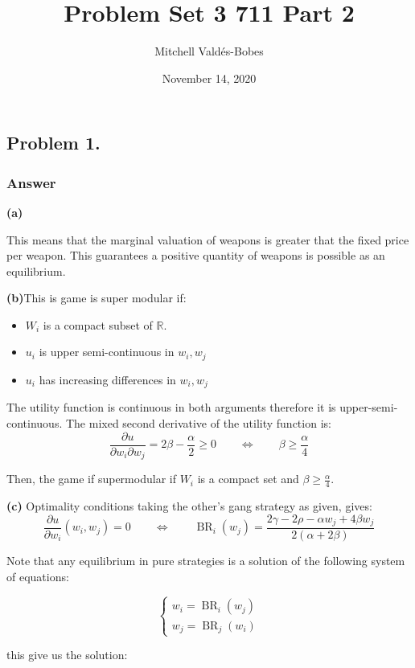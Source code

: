 \documentclass{article}
\title{Problem Set 3 711 Part 2}
\author{Mitchell Valdés-Bobes}
\date{November 14, 2020}
\theoremstyle{definition}
\newcommand{\qiffq}{\qquad \iff \qquad}
\begin{document}
\maketitle
\subsection*{Problem 1.}

\subsubsection*{Answer}
\newline
\textbf{(a)}

This means that the marginal valuation of weapons is greater that the fixed price per weapon. This guarantees a positive quantity of weapons is possible as an equilibrium.

\textbf{(b)}\newline This is game is super modular if:
\begin{itemize}
    \item $W_{i}$ is a compact subset of $\mathbb{R}$.
    \item $u_{i}$ is upper semi-continuous in $w_{i}, w_j$
    \item $u_{i}$ has increasing differences in $w_{i}, w_j$
\end{itemize}

The utility function is continuous in both arguments therefore it is upper-semi-continuous. The mixed second derivative of the utility function is:
$$\frac{\partial u}{\partial w_i \partial w_j} = 2 \beta -\frac{\alpha }{2} \geq 0 \qiffq \beta \geq \frac{\alpha}{4}$$

Then, the game if supermodular if $W_i$ is a compact set and $\beta \geq \frac{\alpha}{4}$.

\textbf{(c)}
Optimality conditions taking the other's gang strategy as given, gives:
$$\frac{\partial u}{\partial w_i}(w_i, w_j) = 0 \qiffq \operatorname{BR}_i(w_j) = \frac{2 \gamma -2 \rho -\alpha w_j+4 \beta  w_j}{2 (\alpha +2 \beta )}
$$

Note that any equilibrium in pure strategies is a solution of the following system of equations:

$$\left\{ \begin{array}{cc}
    w_i = \operatorname{BR}_i(w_j)   \\
    w_j = \operatorname{BR}_j(w_i) 
\end{array}$$

this give us the solution:
\end{document}
